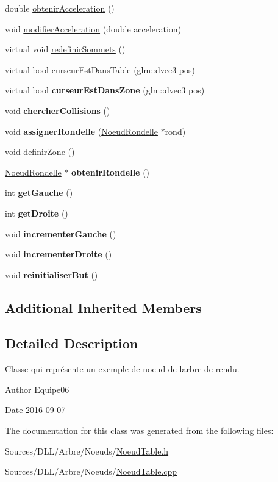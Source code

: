 \begin{DoxyCompactItemize}
\item 
double \hyperlink{group__inf2990_ga28011811ced7c04906780070a7762ec3}{obtenir\+Acceleration} ()
\item 
void \hyperlink{group__inf2990_ga1ac0745a780e04a265ee01bec42210e1}{modifier\+Acceleration} (double acceleration)
\item 
virtual void \hyperlink{group__inf2990_ga37c3779e4662401c1ed6fb64de2c43bf}{redefinir\+Sommets} ()
\item 
virtual bool \hyperlink{group__inf2990_ga4e59d47514e12d1bdcf3047ecc4230c9}{curseur\+Est\+Dans\+Table} (glm\+::dvec3 pos)
\item 
virtual bool {\bfseries curseur\+Est\+Dans\+Zone} (glm\+::dvec3 pos)
\item 
void {\bfseries chercher\+Collisions} ()
\item 
void {\bfseries assigner\+Rondelle} (\hyperlink{class_noeud_rondelle}{Noeud\+Rondelle} $\ast$rond)
\item 
void \hyperlink{group__inf2990_ga74c94e6298b50f2ce1b893da20d9662b}{definir\+Zone} ()
\item 
\hyperlink{class_noeud_rondelle}{Noeud\+Rondelle} $\ast$ {\bfseries obtenir\+Rondelle} ()
\item 
int {\bfseries get\+Gauche} ()
\item 
int {\bfseries get\+Droite} ()
\item 
void {\bfseries incrementer\+Gauche} ()
\item 
void {\bfseries incrementer\+Droite} ()
\item 
void {\bfseries reinitialiser\+But} ()
\end{DoxyCompactItemize}
\subsection*{Additional Inherited Members}


\subsection{Detailed Description}
Classe qui représente un exemple de noeud de l\textquotesingle{}arbre de rendu. 

\begin{DoxyAuthor}{Author}
Equipe06 
\end{DoxyAuthor}
\begin{DoxyDate}{Date}
2016-\/09-\/07 
\end{DoxyDate}


The documentation for this class was generated from the following files\+:\begin{DoxyCompactItemize}
\item 
Sources/\+D\+L\+L/\+Arbre/\+Noeuds/\hyperlink{_noeud_table_8h}{Noeud\+Table.\+h}\item 
Sources/\+D\+L\+L/\+Arbre/\+Noeuds/\hyperlink{_noeud_table_8cpp}{Noeud\+Table.\+cpp}\end{DoxyCompactItemize}
